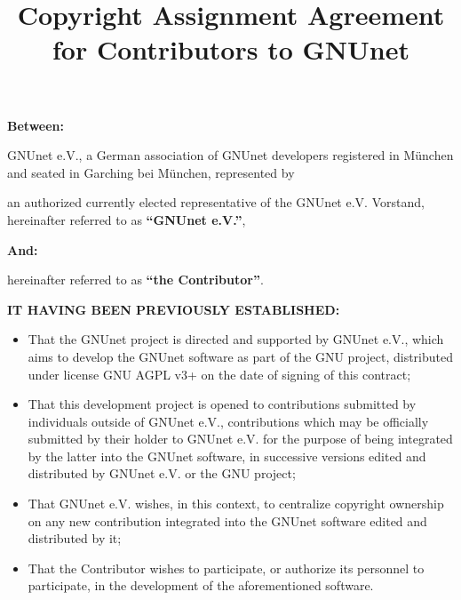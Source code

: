 \documentclass[a4paper]{article} %
\title{Copyright Assignment Agreement \\ for Contributors to GNUnet}
\date{}
\begin{document}
\maketitle
\noindent
{\bf Between:}

GNUnet e.V., a German association of GNUnet developers
registered in M\"unchen and seated in Garching bei M\"unchen,
represented by

\vspace{2cm}

an authorized currently elected representative of the
GNUnet e.V. Vorstand, hereinafter referred to as {\bf ``GNUnet e.V.''},

\noindent
{\bf And:}

\vspace{4cm}
hereinafter referred to as {\bf ``the Contributor''}.

\vspace{0.5cm}

\noindent
{\bf IT HAVING BEEN PREVIOUSLY ESTABLISHED:}
\begin{itemize}
\item That the GNUnet project is directed and supported by GNUnet e.V.,
  which aims to develop the GNUnet software as part of the GNU project,
  distributed under license GNU AGPL v3+ on the date of signing of this
  contract;
\item That this development project is opened to contributions
  submitted by individuals outside of GNUnet e.V., contributions which
  may be officially submitted by their holder to GNUnet e.V. for the
  purpose of being integrated by the latter into the GNUnet software,
  in successive versions edited and distributed by GNUnet e.V. or the
  GNU project;
\item That GNUnet e.V. wishes, in this context, to centralize copyright
  ownership on any new contribution integrated into the GNUnet software
  edited and distributed by it;
\item That the Contributor wishes to participate, or authorize its
  personnel to participate, in the development of the aforementioned
  software.
\end{itemize}
\end{document}
